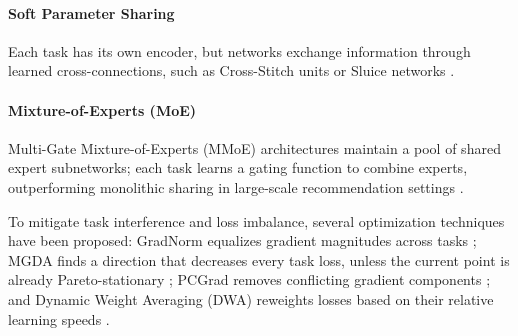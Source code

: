 \paragraph*{Soft Parameter Sharing}
Each task has its own encoder, but networks exchange information through learned cross-connections, such as Cross-Stitch units \cite{misra2016cross} or Sluice networks \cite{ruder2017sluice}.
\paragraph*{Mixture-of-Experts (MoE)}
Multi-Gate Mixture-of-Experts (MMoE) architectures maintain a pool of shared expert subnetworks; each task learns a gating function to combine experts, outperforming monolithic sharing in large-scale recommendation settings \cite{ma2018mmoe}.

To mitigate task interference and loss imbalance, several optimization techniques have been proposed: GradNorm equalizes gradient magnitudes across tasks \cite{chen2018gradnorm}; MGDA finds a direction that decreases every task loss, unless the current point is already Pareto-stationary \cite{sener2018mgda};
PCGrad removes conflicting gradient components \cite{yu2020pcgrad}; and Dynamic Weight Averaging (DWA) reweights losses based on their relative learning speeds \cite{liu2019dwa}.

